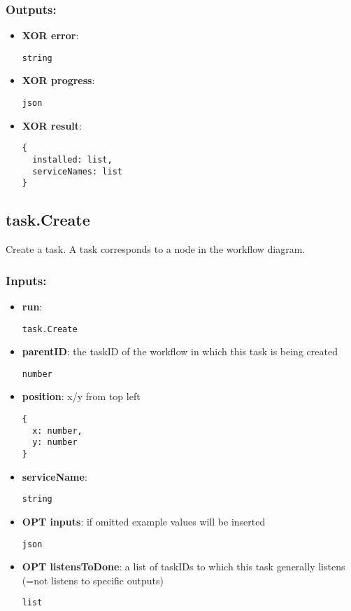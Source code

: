 \subsubsection*{Outputs:}
\begin{itemize}
  \small
    \item \textbf{XOR error}: 
\begin{lstlisting}
string
\end{lstlisting}
    \item \textbf{XOR progress}: 
\begin{lstlisting}
json
\end{lstlisting}
    \item \textbf{XOR result}: 
\begin{lstlisting}
{
  installed: list, 
  serviceNames: list
}
\end{lstlisting}
  \end{itemize}

\subsection{task.Create}
\label{ch:builtinservices:task.Create}
Create a task. A task corresponds to a node in the workflow diagram.
\subsubsection*{Inputs:}
\begin{itemize}
  \small
    \item \textbf{run}: 
\begin{lstlisting}
task.Create
\end{lstlisting}
    \item \textbf{parentID}: the taskID of the workflow in which this task is being created
\begin{lstlisting}
number
\end{lstlisting}
    \item \textbf{position}: x/y from top left
\begin{lstlisting}
{
  x: number, 
  y: number
}
\end{lstlisting}
    \item \textbf{serviceName}: 
\begin{lstlisting}
string
\end{lstlisting}
    \item \textbf{OPT inputs}: if omitted example values will be inserted
\begin{lstlisting}
json
\end{lstlisting}
    \item \textbf{OPT listensToDone}: a list of taskIDs to which this task generally listens (=not listens to specific outputs)
\begin{lstlisting}
list
\end{lstlisting}
  \end{itemize}
